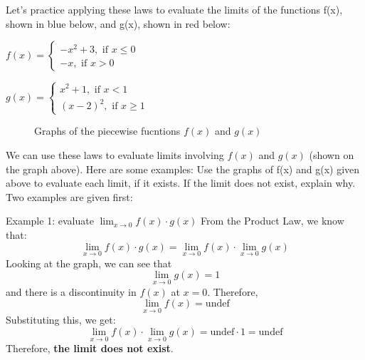 Let's practice applying these laws to evaluate the limits of the functions f(x), 
shown in blue below, and g(x), shown in red below:

$f(x) = \begin{cases}
    -x^2+3, \text{ if } x \leq 0\\
    -x, \text{ if } x > 0
\end{cases}$

$g(x) = \begin{cases}
   x^2+1, \text{ if } x < 1 \\
    (x-2)^2, \text{ if } x \geq 1
\end{cases}$

\begin{figure}[htbp]
\centering
{}
\caption{Graphs of the piecewise fucntions $f(x)$ and $g(x)$}
\end{figure}
We can use these laws to evaluate limits involving $f(x)$ and $g(x)$ (shown on the 
graph above). Here are some examples:
Use the graphs of f(x) and g(x) given above to evaluate each limit, if it exists. 
If the limit does not exist, explain why. Two examples are given first:

Example 1: evaluate $\lim_{x\to0} f(x) \cdot g(x)$
From the Product Law, we know that:
$$\lim_{x\to0} f(x) \cdot g(x) = \lim_{x\to0}f(x) \cdot \lim_{x\to0} g(x)$$
Looking at the graph, we can see that $$\lim_{x\to0}g(x) = 1$$ and there is a 
discontinuity in $f(x)$ at $x=0$. Therefore, $$\lim_{x\to0}f(x) = \text{undef}$$
Substituting this, we get: $$\lim_{x\to0}f(x) \cdot \lim_{x\to0} g(x) = 
\text{undef} \cdot 1 = \text{undef}$$
Therefore, \textbf{the limit does not exist}. 

